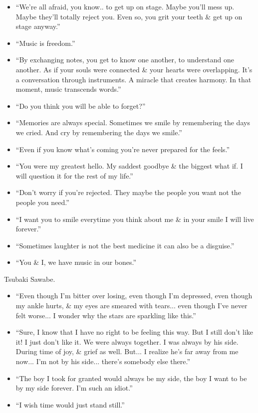 \documentclass{article}
\begin{document}
\begin{enumerate}
\begin{itemize}
    	\item ``We're all afraid, you know.. to get up on stage. Maybe you'll mess up. Maybe they'll totally reject you. Even so, you grit your teeth \& get up on stage anyway.''
    	\item ``Music is freedom.''
    	\item ``By exchanging notes, you get to know one another, to understand one another. As if your souls were connected \& your hearts were overlapping. It's a conversation through instruments. A miracle that creates harmony. In that moment, music transcends words.''
    	\item ``Do you think you will be able to forget?''
    	\item ``Memories are always special. Sometimes we smile by remembering the days we cried. And cry by remembering the days we smile.''
    	\item ``Even if you know what's coming you're never prepared for the feels.''
    	\item ``You were my greatest hello. My saddest goodbye \& the biggest what if. I will question it for the rest of my life.''
    	\item ``Don't worry if you're rejected. They maybe the people you want not the people you need.''
    	\item ``I want you to smile everytime you think about me \& in your smile I will live forever.''
    	\item ``Sometimes laughter is not the best medicine it can also be a disguise.''
    	\item ``You \& I, we have music in our bones.''
    \end{itemize}
    {\sc Tsubaki Sawabe.}
    \begin{itemize}
    	\item ``Even though I'm bitter over losing, even though I'm depressed, even though my ankle hurts, \& my eyes are smeared with tears... even though I've never felt worse... I wonder why the stars are sparkling like this.''
    	\item ``Sure, I know that I have no right to be feeling this way. But I still don't like it! I just don't like it. We were always together. I was always by his side. During time of joy, \& grief as well. But... I realize he's far away from me now... I'm not by his side... there's somebody else there.''
    	\item ``The boy I took for granted would always be my side, the boy I want to be by my side forever. I'm such an idiot.''
    	\item ``I wish time would just stand still.''

\end{itemize}
\end{enumerate}
\end{document}
